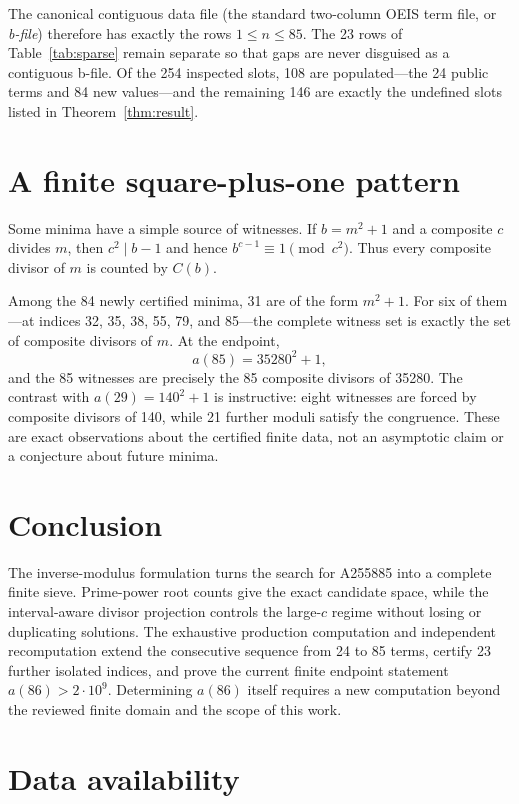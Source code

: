 \documentclass[11pt]{article}
\begin{document}
The canonical contiguous data file (the standard two-column OEIS term file,
or \emph{b-file}) therefore has exactly the rows $1\leq n\leq85$.  The 23
rows of Table~\ref{tab:sparse} remain separate so that gaps are never
disguised as a contiguous b-file.  Of the 254 inspected slots, 108 are
populated---the 24 public terms and 84 new values---and the remaining 146 are
exactly the undefined slots listed in Theorem~\ref{thm:result}.

\section{A finite square-plus-one pattern}

Some minima have a simple source of witnesses.  If $b=m^2+1$ and a composite
$c$ divides $m$, then $c^2\mid b-1$ and hence
$b^{c-1}\equiv1\pmod{c^2}$.  Thus every composite divisor of $m$ is counted
by $C(b)$.

Among the 84 newly certified minima, 31 are of the form $m^2+1$.  For six of
them---at indices 32, 35, 38, 55, 79, and 85---the complete witness set is
exactly the set of composite divisors of $m$.  At the endpoint,
\[
 a(85)=35280^2+1,
\]
and the 85 witnesses are precisely the 85 composite divisors of 35280.  The
contrast with $a(29)=140^2+1$ is instructive: eight witnesses are forced by
composite divisors of 140, while 21 further moduli satisfy the congruence.
These are exact observations about the certified finite data, not an
asymptotic claim or a conjecture about future minima.

\section{Conclusion}

The inverse-modulus formulation turns the search for A255885 into a complete
finite sieve.  Prime-power root counts give the exact candidate space, while
the interval-aware divisor projection controls the large-$c$ regime without
losing or duplicating solutions.  The exhaustive production computation and
independent recomputation extend the consecutive sequence from 24 to 85
terms, certify 23 further isolated indices, and prove the current finite
endpoint statement $a(86)>2\cdot10^9$.  Determining $a(86)$ itself requires a
new computation beyond the reviewed finite domain and the scope of this work.

\section*{Data availability}
\end{document}
